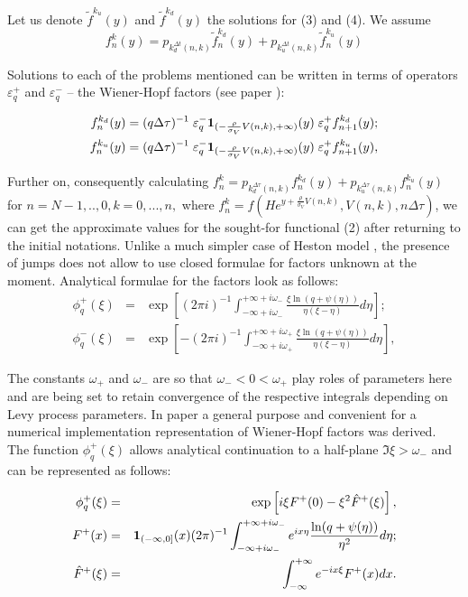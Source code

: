 \documentclass[a4paper]{jpconf}
\begin{document}
Let us denote $\widetilde{f}^{k_u}(y)$ and $\widetilde{f}^{k_d}(y)$ the solutions for (3) and (4). We assume
$$
f_{n}^{k}(y) = p_{k^{{\Delta t}}_{d}(n,k)}\widetilde{f}^{k_d}_{n}(y) + p_{k^{{\Delta t}}_{u}(n,k)}\widetilde{f}^{k_u}_{n}(y)$$

Solutions to each of the problems mentioned can be written in terms of operators $\varepsilon^{+}_{q}$ and $\varepsilon^{-}_{q}$ -- the Wiener-Hopf factors (see paper \cite{kudr_and_lev}):

\begin{eqnarray*}
	f_{n}^{k_{d}}(y) = (q{\Delta \tau})^{-1} \; \varepsilon^{-}_{q} {\bf 1}_{(- \frac{\rho}{\sigma_V}V(n,k), +\infty)}(y) \; \varepsilon^{+}_{q} f_{n+1}^{k_d}(y);\\
	f_{n}^{k_{u}}(y) = (q{\Delta \tau})^{-1} \; \varepsilon^{-}_{q} {\bf 1}_{(- \frac{\rho}{\sigma_V}V(n,k), +\infty)}(y) \; \varepsilon^{+}_{q} f_{n+1}^{k_u}(y),
\end{eqnarray*}

Further on, consequently calculating $f_n^k = p_{k_d^{\Delta \tau}(n,k)} f_n^{k_d}(y) + p_{k_u^{\Delta \tau}(n,k)} f_n^{k_u}(y)$ for $n=N-1,..,0, k = 0,...,n,$
where $f_n^k = f(He^{y+\frac{\rho}{\sigma_V}V(n,k)}, V(n,k), n\Delta \tau)$, we can get the approximate values for the sought-for functional (2) after returning to the initial notations. Unlike a much simpler case of Heston model \cite{kudr_rod}, the presence of jumps does not allow to use closed formulae for factors unknown at the moment. Analytical formulae for the factors look as follows:
\begin{eqnarray*}
	\phi^+_q(\xi)&=&\exp\left[(2\pi i)^{-1}
	\int_{-\infty+i\omega_-}^{+\infty+i\omega_-}\frac{\xi\ln(q+\psi(\eta))}
	{\eta(\xi-\eta)}d\eta\right];\\
	\phi^-_q(\xi)&=&\exp\left[-(2\pi i)^{-1}
	\int_{-\infty+i\omega_+}^{+\infty+i\omega_+}\frac{\xi\ln(q+\psi(\eta))}
	{\eta(\xi-\eta)}d\eta\right],
\end{eqnarray*}

The constants $\omega_+$ and $\omega_-$ are so that $\omega_-<0<\omega_+$ play roles of parameters here and are being set to retain convergence of the respective integrals depending on Levy process parameters. In paper \cite{kudr_mex} a general purpose and convenient for a numerical implementation representation of Wiener-Hopf factors was derived. The function $\phi^+_q(\xi)$ allows analytical continuation to a half-plane $\Im \xi>\omega_-$ and can be represented as follows:

\begin{eqnarray*}
	\phi^+_q(\xi)&=&\exp\left[i\xi F^+(0)-\xi^2\hat{F}^+(\xi)\right],\\ 
	F^+(x)&=&{\bf 1}_{(-\infty,0]}(x)(2\pi)^{-1}
	\int_{-\infty+i\omega_-}^{+\infty+i\omega_-}e^{ix\eta}\frac{\ln(q+\psi(\eta))}
	{\eta^2}d\eta;
	\\
	\hat{F}^+(\xi)&=&\int_{-\infty}^{+\infty}e^{-ix\xi}F^+(x)dx.
\end{eqnarray*}
\end{document}
